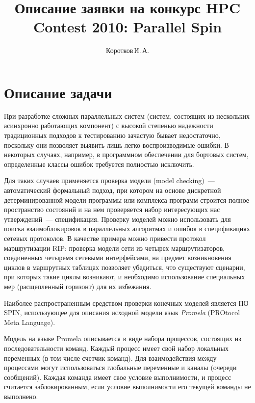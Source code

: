 \documentclass[12pt,a4paper,fleqn]{article}
\title{Описание заявки на конкурс HPC Contest 2010: Parallel Spin}
\author{Коротков\,И.\,А.}
\begin{document}

\section{Описание задачи}

При разработке сложных параллельных систем (систем, состоящих из нескольких асинхронно работающих
компонент) с высокой степенью надежности традиционных подходов к тестированию зачастую бывает
недостаточно, поскольку они позволяет выявить лишь легко воспроизводимые ошибки. В некоторых
случаях, например, в программном обеспечении для бортовых систем, определенные классы ошибок
требуется полностью исключить.

Для таких случаев применяется проверка модели (model checking)~--- автоматический
формальный подход, при котором на основе дискретной детерминированной модели программы или
комплекса программ строится полное пространство состояний и на нем проверяется набор
интересующих нас утверждений~--- спецификация. Проверку моделей можно использовать для
поиска взаимоблокировок в параллельных алгоритмах и ошибок в спецификациях сетевых
протоколов. В качестве примера можно привести протокол маршрутизации RIP: проверка модели
сети из четырех маршрутизаторов, соединенных четыремя сетевыми интерфейсами, на предмет
возникновения циклов в маршрутных таблицах позволяет убедиться, что существуют сценарии,
при которых такие циклы возникают, и необходимо использование специальных мер
(расщепленный горизонт) для их избежания.

Наиболее распространенным средством проверки конечных моделей является ПО SPIN,
использующее для описания исходной модели язык \emph{Promela} (PROtocol Meta Language).

Модель на языке Promela описывается в виде набора процессов, состоящих из последовательности
команд. Каждый процесс имеет свой набор локальных переменных (в том числе счетчик команд). Для
взаимодействия между процессами могут использоваться глобальные переменные и каналы (очереди
сообщений). Каждая команда имеет свое условие выполнимости, и процесс считается заблокированным,
если условие выполнимости его текущей команды не выполнено.
\end{document}
